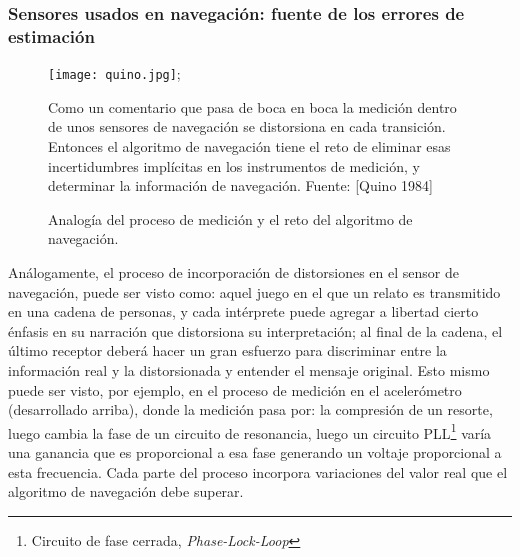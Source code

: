 \documentclass[10pt]{report}
\numberwithin{equation}{chapter}
\numberwithin{algorithm}{chapter}
\begin{document}
\subsubsection{Sensores usados en navegación: fuente de los errores de estimación}\label{marcos}
\begin{figure}
\begin{center}
\texttt{[image: quino.jpg]};
\caption{Analogía del proceso de medición y el reto del algoritmo de navegación.}
\scriptsize{Como un comentario que pasa de boca en boca la medición dentro de unos sensores de navegación se distorsiona en cada transición. Entonces el algoritmo de navegación tiene el reto de eliminar esas incertidumbres implícitas en los instrumentos de medición, y determinar la información de navegación. Fuente: [Quino 1984]}
\end{center}
\end{figure}
Análogamente, el proceso de incorporación de distorsiones en el sensor de navegación, puede ser visto como: aquel juego en el que un relato es transmitido en una cadena de personas, y cada intérprete puede agregar a libertad cierto énfasis en su narración que distorsiona su interpretación; al final de la cadena, el último receptor deberá hacer un gran esfuerzo para discriminar entre la información real y la distorsionada y entender el mensaje original. Esto mismo puede ser visto, por ejemplo, en el proceso de medición en el acelerómetro (desarrollado arriba), donde la medición pasa por: la compresión de un resorte, luego cambia la fase de un circuito de resonancia, luego un circuito PLL\footnote{Circuito de fase cerrada, \emph{Phase-Lock-Loop}} varía una ganancia que es proporcional a esa fase generando un voltaje proporcional a esta frecuencia. Cada parte del proceso incorpora variaciones del valor real que el algoritmo de navegación debe superar.\par
\end{document}

